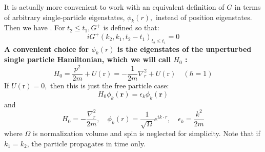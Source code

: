 It is actually more convenient to work with an equivalent definition of $G$ in terms of arbitrary single-particle eigenstates, $\phi_{k}(r),$ instead of position eigenstates. Then we have .
For $t_{2} \leqslant t_{1}, G^{+}$ is defined so that:
\begin{equation}i G^{+}\left(k_{2}, k_{1}, t_{2}-t_{1}\right)_{t_{2}\leq t_{1}}=0\end{equation}
\textbf{A convenient choice for $\phi_{k}(r)$ is the eigenstates of the unperturbed single particle Hamiltonian, which we will call $H_{0}$ :}
$$H_{0}=\frac{p^{2}}{2 m}+U(\mathrm{r})=-\frac{1}{2 m} \nabla_{r}^{2}+U(\mathrm{r}) \quad(\hbar=1)$$
If $U(\mathrm{r})=0,$ then this is just the free particle case:
$$H_{0} \phi_{k}(\mathbf{r})=\epsilon_{k} \phi_{k}(\mathbf{r})$$
and
\begin{equation}H_{0}=-\frac{\nabla_{r}^{2}}{2 m}, \quad \phi_{k}(r)=\frac{1}{\sqrt{\Omega}} e^{i k \cdot r}, \quad \epsilon_{k}=\frac{k^{2}}{2 m}
\label{nrqm-free-particle}
\end{equation}
where $\Omega$ is normalization volume and spin is neglected for simplicity. Note that if $k_1=k_2$, the particle propagates in time only.

